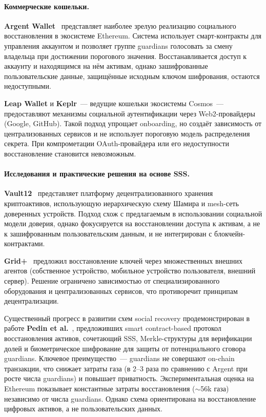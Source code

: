 \paragraph{Коммерческие кошельки.}

\textbf{Argent Wallet}~\cite{s1} представляет наиболее зрелую реализацию социального восстановления в экосистеме Ethereum. Система использует смарт-контракты для управления аккаунтом и позволяет группе guardians голосовать за смену владельца при достижении порогового значения. Восстанавливается доступ к аккаунту и находящимся на нём активам, однако зашифрованные пользовательские данные, защищённые исходным ключом шифрования, остаются недоступными.

\textbf{Leap Wallet} и \textbf{Keplr}~--- ведущие кошельки экосистемы Cosmos~--- предоставляют механизмы социальной аутентификации через Web2-провайдеры (Google, GitHub). Такой подход упрощает onboarding, но создаёт зависимость от централизованных сервисов и не использует пороговую модель распределения секрета. При компрометации OAuth-провайдера или его недоступности восстановление становится невозможным.

\paragraph{Исследования и практические решения на основе SSS.}

\textbf{Vault12}~\cite{s11} представляет платформу децентрализованного хранения криптоактивов, использующую иерархическую схему Шамира и mesh-сеть доверенных устройств. Подход схож с предлагаемым в использовании социальной модели доверия, однако фокусируется на восстановлении доступа к активам, а не к зашифрованным пользовательским данным, и не интегрирован с блокчейн-контрактами.

\textbf{Grid+}~\cite{s12} предложил восстановление ключей через множественных внешних агентов (собственное устройство, мобильное устройство пользователя, внешний сервер). Решение ограничено зависимостью от специализированного оборудования и централизованных сервисов, что противоречит принципам децентрализации.

Существенный прогресс в развитии схем social recovery продемонстрирован в работе \textbf{Pedin et al.}~\cite{s15}, предложивших smart contract-based протокол восстановления активов, сочетающий SSS, Merkle-структуры для верификации долей и биометрическое шифрование для защиты от потенциального сговора guardians. Ключевое преимущество~--- guardians не совершают on-chain транзакции, что снижает затраты газа (в 2--3 раза по сравнению с Argent при росте числа guardians) и повышает приватность. Экспериментальная оценка на Ethereum показывает константные затраты восстановления ($\sim$56k газа) независимо от числа guardians. Однако схема ориентирована на восстановление цифровых активов, а не пользовательских данных.

